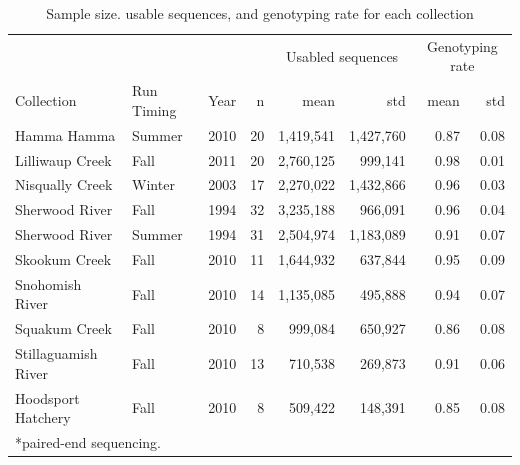 \documentclass[12pt, one column]{article}
\begin{document}
\begin{table}[H]
\caption{\label{tab:table-name}Sample size. usable sequences, and genotyping rate for each collection}
\begin{tabular}{llrrrrrr}
\toprule
{} & {} & {} & {} & \multicolumn{2}{c}{Usabled sequences} & \multicolumn{2}{c}{Genotyping rate}\\
Collection &  Run Timing   &  Year &  n &          mean &        std &              mean &       std \\
\midrule
Hamma Hamma            &  Summer &  2010 &  20 &         1,419,541 & 1,427,760 &            0.87 &       0.08 \\
Lilliwaup Creek        &    Fall &  2011 &  20 &         2,760,125 &   999,141 &            0.98 &       0.01 \\
Nisqually Creek &  Winter &  2003 &  17 &         2,270,022 & 1,432,866 &            0.96 &       0.03 \\
Sherwood River     &    Fall &  1994 &  32 &         3,235,188 &   966,091 &            0.96 &       0.04 \\
Sherwood River   &  Summer &  1994 &  31 &         2,504,974 & 1,183,089 &            0.91 &       0.07 \\
Skookum Creek          &    Fall &  2010 &  11 &         1,644,932 &   637,844 &            0.95 &       0.09 \\
Snohomish River        &    Fall &  2010 &  14 &         1,135,085 &   495,888 &            0.94 &       0.07 \\
Squakum Creek          &     Fall &  2010 &   8 &           999,084 &   650,927 &            0.86 &       0.08 \\
Stillaguamish River    &    Fall &  2010 &  13 &           710,538 &   269,873 &            0.91 &       0.06 \\
\midrule
Hoodsport Hatchery     &    Fall &  2010 &   8 &           509,422 &   148,391 &            0.85 &       0.08 \\
\bottomrule
\multicolumn{6}{l}{*paired-end sequencing.}
\end{tabular}
\end {table}
\end{document}
